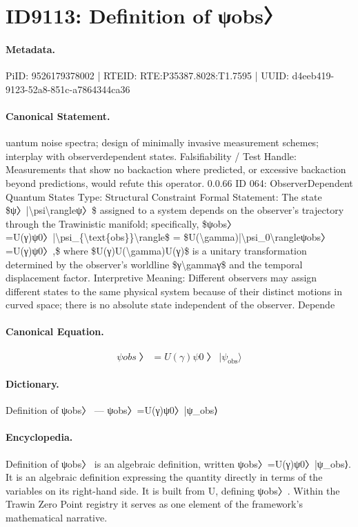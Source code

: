 \section*{ID9113: Definition of ψobs〉}
\paragraph{Metadata.}
PiID: 9526179378002 | RTEID: RTE:P35387.8028:T1.7595 | UUID: d4eeb419-9123-52a8-851c-a7864344ca36

\paragraph{Canonical Statement.}
uantum noise spectra; design of minimally invasive measurement schemes; interplay with observerdependent states. Falsifiability / Test Handle: Measurements that show no backaction where predicted, or excessive backaction beyond predictions, would refute this operator. 0.0.66 ID 064: ObserverDependent Quantum States Type: Structural Constraint Formal Statement: The state \$ψ〉|\textbackslash{}psi\textbackslash{}rangleψ〉\$ assigned to a system depends on the observer’s trajectory through the Trawinistic manifold; specifically, \$ψobs〉=U(γ)ψ0〉|\textbackslash{}psi\_\{\textbackslash{}text\{obs\}\}\textbackslash{}rangle\$ = \$U(\textbackslash{}gamma)|\textbackslash{}psi\_0\textbackslash{}rangleψobs〉=U(γ)ψ0〉,\$ where \$U(γ)U(\textbackslash{}gamma)U(γ)\$ is a unitary transformation determined by the observer’s worldline \$γ\textbackslash{}gammaγ\$ and the temporal displacement factor. Interpretive Meaning: Different observers may assign different states to the same physical system because of their distinct motions in curved space; there is no absolute state independent of the observer. Depende

\paragraph{Canonical Equation.}
\[
ψobs〉=U(γ)ψ0〉|\psi_{\text{obs}}\rangle
\]

\paragraph{Dictionary.}
Definition of ψobs〉 — ψobs〉=U(γ)ψ0〉|ψ\_obs⟩

\paragraph{Encyclopedia.}
Definition of ψobs〉 is an algebraic definition, written ψobs〉=U(γ)ψ0〉|ψ\_obs⟩. It is an algebraic definition expressing the quantity directly in terms of the variables on its right-hand side. It is built from U, defining ψobs〉. Within the Trawin Zero Point registry it serves as one element of the framework's mathematical narrative.
